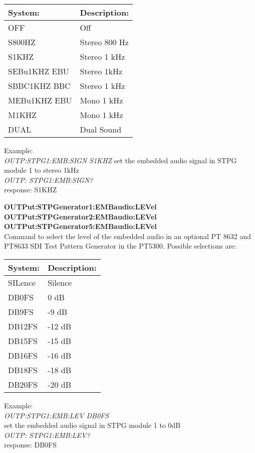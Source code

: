 \begin{tabular}{|l|l|}
\hline
System:		& Description: \\ \hline
OFF				& Off \\ \hline
S800HZ		& Stereo 800 Hz \\ \hline 
S1KHZ			& Stereo 1 kHz\\ \hline
SEBu1KHZ EBU	& Stereo 1kHz\\ \hline
SBBC1KHZ BBC	& Stereo 1 kHz\\ \hline
MEBu1KHZ EBU	& Mono 1 kHz\\ \hline
M1KHZ			& Mono 1 kHz\\ \hline
DUAL			& Dual Sound\\ \hline
\end{tabular}

Example:\\
\textit{OUTP:STPG1:EMB:SIGN S1KHZ}
set the embedded audio signal in STPG module 1 to stereo 1kHz\\
\textit{OUTP: STPG1:EMB:SIGN?}\\
response: S1KHZ

\textbf{OUTPut:STPGenerator1:EMBaudio:LEVel}\\
\textbf{OUTPut:STPGenerator2:EMBaudio:LEVel}\\
\textbf{OUTPut:STPGenerator5:EMBaudio:LEVel}\\
Command to select the level of the embedded audio in an optional PT 8632 and PT8633 SDI Test Pattern Generator in the PT5300. Possible selections are:

\begin{tabular}{|l|l|}
\hline
System:		& Description: \\ \hline
SILence		& Silence\\ \hline
DB0FS			& 0 dB\\ \hline
DB9FS			& -9 dB\\ \hline
DB12FS		& -12 dB\\ \hline
DB15FS		& -15 dB\\ \hline
DB16FS		& -16 dB\\ \hline
DB18FS		& -18 dB\\ \hline
DB20FS		& -20 dB\\ \hline
\end{tabular}

Example:\\
\textit{OUTP:STPG1:EMB:LEV DB0FS}\\
set the embedded audio signal in STPG module 1 to 0dB\\
\textit{OUTP: STPG1:EMB:LEV?}\\
response: DB0FS

